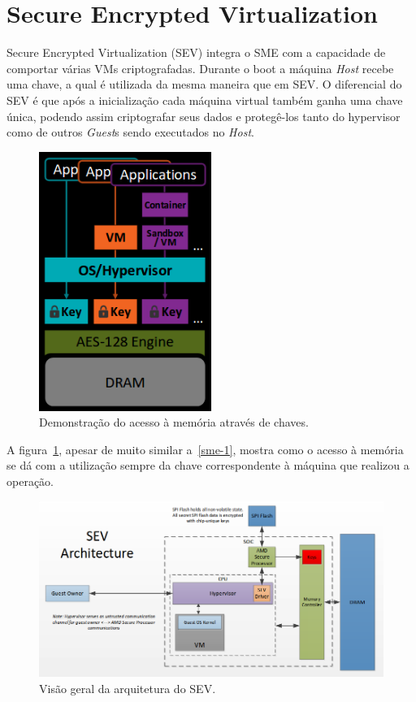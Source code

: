 \documentclass{report}
\begin{document}
\section{Secure Encrypted Virtualization}

Secure Encrypted Virtualization (SEV) integra o SME com a capacidade de
comportar várias VMs criptografadas. Durante o boot a máquina \textit{Host} recebe uma
chave, a qual é utilizada da mesma maneira que em SEV\@. O diferencial do SEV é
que após a inicialização cada máquina virtual também ganha uma chave única,
podendo assim criptografar seus dados e protegê-los tanto do hypervisor como de
outros \textit{Guest}s sendo executados no \textit{Host}.

\begin{figure}[h]
    \centering
    \includegraphics[width=0.5\textwidth]{img/sev}
    \caption{Demonstração do acesso à memória através de chaves.}\label{sev}
\end{figure}

A figura~\ref{sev}, apesar de muito similar a~\ref{sme-1}, mostra como o acesso
à memória se dá com a utilização sempre da chave correspondente à máquina que
realizou a operação.


\begin{figure}[h]
    \centering
    \includegraphics[width=1\textwidth]{img/sev-architecture}
    \caption{Visão geral da arquitetura do SEV\@.}\label{sev-architecture}
\end{figure}
\end{document}
